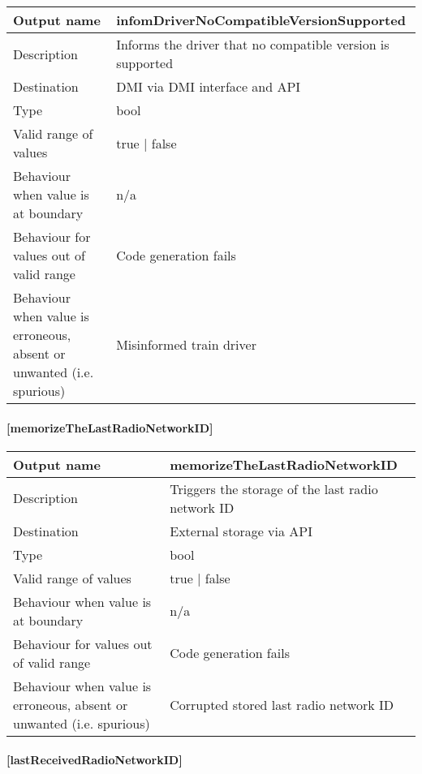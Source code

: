 \begin{longtable}{p{}p{}}
	\toprule
	Output name				& infomDriverNoCompatibleVersionSupported \\
	\midrule
	Description				& Informs the driver that no compatible version is supported \\
	\midrule
	Destination				& DMI via DMI interface and API \\ 
	\midrule
	Type					& bool \\
	\midrule
	Valid range of values	& true | false \\
	\midrule
	Behaviour when value is at boundary	& n/a \\
	\midrule
	Behaviour for values out of valid range	& Code generation fails \\
	\midrule
	Behaviour when value is erroneous, absent or unwanted (i.e. spurious) & Misinformed train driver \\
	\bottomrule
\end{longtable}

\paragraph{[memorizeTheLastRadioNetworkID]}

\begin{longtable}{p{}p{}}
	\toprule
	Output name				& memorizeTheLastRadioNetworkID \\
	\midrule
	Description				& Triggers the storage of the last radio network ID \\
	\midrule
	Destination				& External storage via API \\ 
	\midrule
	Type					& bool \\
	\midrule
	Valid range of values	& true | false \\
	\midrule
	Behaviour when value is at boundary	& n/a \\
	\midrule
	Behaviour for values out of valid range	& Code generation fails \\
	\midrule
	Behaviour when value is erroneous, absent or unwanted (i.e. spurious) & Corrupted stored last radio network ID \\
	\bottomrule
\end{longtable}


\paragraph{[lastReceivedRadioNetworkID]}

